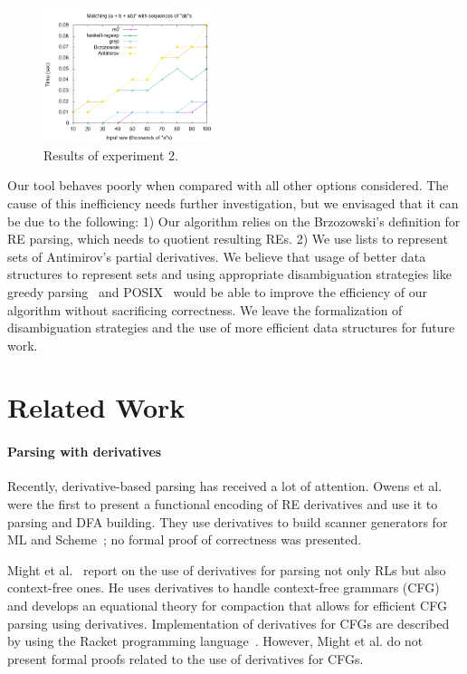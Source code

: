 \documentclass[fleqn,10pt]{SelfArx} %
\theoremstyle{definition}
\begin{document}
\begin{figure}[!ht]
    \includegraphics[width=0.45\textwidth]{abs.png}
   \centering
   \caption{Results of experiment 2.}
   \label{fig:graph2}
\end{figure}

Our tool behaves poorly when compared with all other options
considered. The cause of this inefficiency needs further
investigation, but we envisaged that it can be due to the
following: 1) Our algorithm relies on the Brzozowski's definition for RE
parsing, which needs to quotient resulting REs. 2) We use lists to
represent sets of Antimirov's partial derivatives. We believe that
usage of better data structures to represent sets and using
appropriate disambiguation strategies like greedy
parsing~\cite{FrischC04} and POSIX~\cite{SulzmannL14} would be able to
improve the efficiency of our algorithm without sacrificing
correctness. We leave the formalization of disambiguation strategies
and the use of more efficient data structures for future work.

\section{Related Work}\label{sec:related}

\paragraph{Parsing with derivatives} Recently, derivative-based
parsing has received a lot of attention. Owens et al. were the first
to present a functional encoding of RE derivatives and use it to
parsing and DFA building. They use derivatives to build scanner
generators for ML and Scheme~\cite{Owens2009}; no formal proof of
correctness was presented.

Might et al.~\cite{Might2011} report on
the use of derivatives for parsing not only RLs but also context-free
ones. He uses derivatives to handle context-free grammars (CFG) and
develops an equational theory for compaction that allows for efficient
CFG parsing using derivatives. Implementation of derivatives for CFGs
are described by using the Racket programming
language~\cite{Felleisen2013}. However, Might et al. do not present
formal proofs related to the use of derivatives for CFGs.
\end{document}
